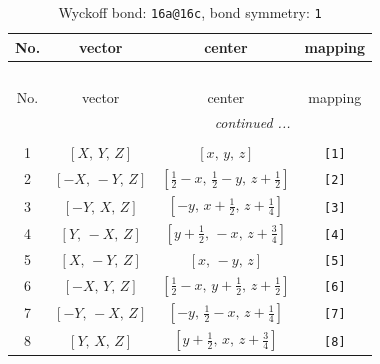 \documentclass[fleqn,8pt]{jsarticle}
\begin{document}
\begin{longtable}{cccc}
\caption{Wyckoff bond: {\tt 16a@16c}, bond symmetry: {\tt 1}}
 \\
 \hline \hline
No. & vector & center & mapping \\ \hline \endfirsthead

\multicolumn{3}{l}{\tablename\ \thetable{}} \\
 \hline \hline
No. & vector & center & mapping \\ \hline \endhead

 \hline \hline
\multicolumn{3}{r}{\footnotesize\it continued ...} \\ \endfoot

 \hline \hline
\multicolumn{3}{r}{} \\ \endlastfoot

1 & $\left[ X,\, Y,\, Z \right]$ & $\left[ x,\, y,\, z \right]$ & {\tt [1]} \\ \hline
2 & $\left[ - X,\, - Y,\, Z \right]$ & $\left[ \frac{1}{2} - x,\, \frac{1}{2} - y,\, z + \frac{1}{2} \right]$ & {\tt [2]} \\ \hline
3 & $\left[ - Y,\, X,\, Z \right]$ & $\left[ - y,\, x + \frac{1}{2},\, z + \frac{1}{4} \right]$ & {\tt [3]} \\ \hline
4 & $\left[ Y,\, - X,\, Z \right]$ & $\left[ y + \frac{1}{2},\, - x,\, z + \frac{3}{4} \right]$ & {\tt [4]} \\ \hline
5 & $\left[ X,\, - Y,\, Z \right]$ & $\left[ x,\, - y,\, z \right]$ & {\tt [5]} \\ \hline
6 & $\left[ - X,\, Y,\, Z \right]$ & $\left[ \frac{1}{2} - x,\, y + \frac{1}{2},\, z + \frac{1}{2} \right]$ & {\tt [6]} \\ \hline
7 & $\left[ - Y,\, - X,\, Z \right]$ & $\left[ - y,\, \frac{1}{2} - x,\, z + \frac{1}{4} \right]$ & {\tt [7]} \\ \hline
8 & $\left[ Y,\, X,\, Z \right]$ & $\left[ y + \frac{1}{2},\, x,\, z + \frac{3}{4} \right]$ & {\tt [8]} \\
\end{longtable}
\end{document}
